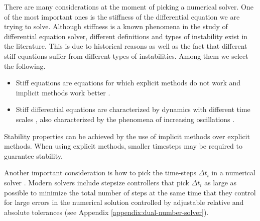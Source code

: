 There are many considerations at the moment of picking a numerical solver. 
One of the most important ones is the stiffness of the differential equation we are trying to solve. 
Although stiffness is a known phenomena in the study of differential equation solver, different definitions and types of instability exist in the literature. 
This is due to historical reasons \cite{Dahlquist_1985} as well as the fact that different stiff equations suffer from different types of instabilities. 
Among them we select the following. 
\begin{itemize}
    \item Stiff equations are equations for which explicit methods do not work and implicit methods work better \cite{hairer-solving-2}.
    \item Stiff differential equations are characterized by dynamics with different time scales \cite{kim_stiff_2021}, also characterized by the phenomena of increasing oscillations \cite{Dahlquist_1985}.
\end{itemize}
Stability properties can be achieved by the use of implicit methods over explicit methods. 
When using explicit methods, smaller timesteps may be required to guarantee stability. 

Another important consideration is how to pick the time-steps $\Delta t_i$ in a numerical solver \cite{hairer-solving-1}. 
Modern solvers include stepsize controllers that pick $\Delta t_i$ as large as possible to minimize the total number of steps at the same time that they control for large errors in the numerical solution controlled by adjustable relative and absolute tolerances (see Appendix \ref{appendix:dual-number-solver}). 






